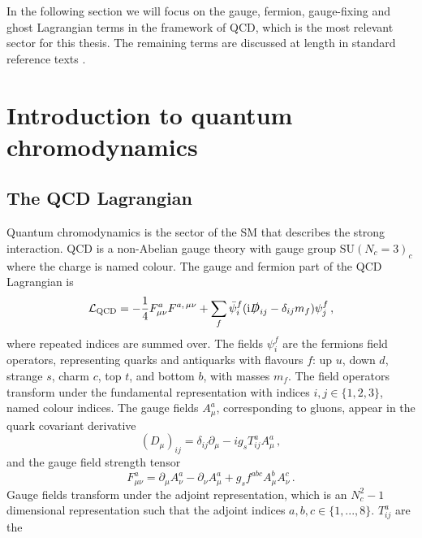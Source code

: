 \documentclass[main.tex]{subfiles}
\begin{document}
    In the following section we will focus on the gauge, fermion, gauge-fixing
    and ghost Lagrangian terms in the framework of QCD, which is the most
    relevant sector for this thesis. The remaining terms are discussed at
    length in standard reference texts \cite{Peskin:1995ev,Schwartz:2014sze,Romao:2012pq}.


\section{Introduction to quantum chromodynamics}\label{sec:qcd}
    \subsection{The QCD Lagrangian}\label{sec:L_qcd}
    Quantum chromodynamics is the sector of the SM that
    describes the strong interaction. 
    QCD is a non-Abelian gauge theory with gauge group
    $\mathrm{SU}(N_{c} = 3)_{c}$ where the charge is named colour.
    The gauge and fermion part of the QCD Lagrangian is
    \begin{equation}\label{eqn:L_QCD}
        \mathcal{L}_{\mathrm{QCD}} = -\dfrac{1}{4}F^{a}_{\mu\nu}F^{a, \, \mu\nu}
        + \sum_{f} \bar{\psi}_{i}^{f}(\mathrm{i}\slashed{D}_{ij} - \delta_{ij}m_{f})\psi_{j}^{f} \, ,
    \end{equation}
    where repeated indices are summed over.
    The fields $\psi_{i}^{f}$ are the fermions field operators,
    representing quarks and antiquarks with flavours $f$: 
    up $u$, down $d$, strange $s$, charm $c$, top $t$, and bottom $b$,
    with masses $m_{f}$. The field operators transform under the fundamental
    representation with indices $i, j \in \{1, 2, 3\}$, named colour indices.
    The gauge fields $A^{a}_{\mu}$, corresponding to gluons, 
    appear in the quark covariant derivative
    \begin{equation}\label{eqn:covariant_deriv}
        (D_{\mu})_{ij} = \delta_{ij}\partial_{\mu} - ig_{s}T^{a}_{ij}A^{a}_{\mu} \, ,
    \end{equation}
    and the gauge field strength tensor
    \begin{equation}\label{eqn:F_munu}
        F^{a}_{\mu\nu} = \partial_{\mu}A^{a}_{\nu} - \partial_{\nu}A^{a}_{\mu} + g_{s} f^{abc}A^{b}_{\mu}A^{c}_{\nu} \, .
    \end{equation}
    Gauge fields transform under the adjoint representation, 
    which is an $N_{c}^{2}-1$ dimensional representation such that
    the adjoint indices $a,b,c \in \{1,...,8\}$. $T^{a}_{ij}$ are the
\end{document}
